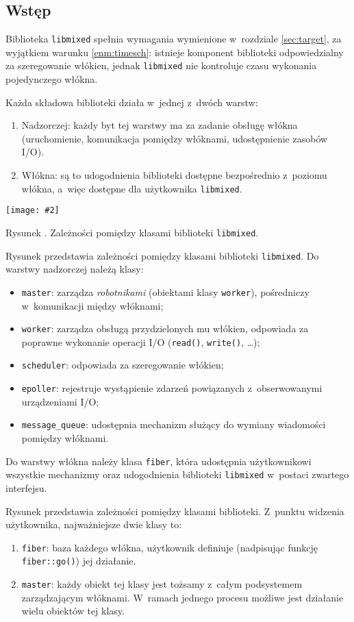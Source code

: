 \documentclass[12pt]{mwart}
\newcommand{\code}{\texttt}
\newcommand{\dcolon}{::}
\newcommand{\procbr}{()}
\newcommand{\function}[1]{\code{#1\procbr}}
\newcounter{figmain}
\newcommand{\myownfigure}[4]{ \newcounter{#1} \setcounter{#1}{\value{figmain}} \addtocounter{figmain}{1} \begin{center} \label{fig:#1} \centering \texttt{[image: \#2]}\\ \nopagebreak[5] \parbox[t]{11.5cm}{Rysunek \arabic{#1}. #3.} \end{center}}
\begin{document}
\subsection{Wstęp}
\indent 
  Biblioteka \code{libmixed} spełnia wymagania wymienione w~rozdziale \ref{sec:target}, za wyjątkiem warunku \ref{enm:timesch}:
  istnieje komponent biblioteki odpowiedzialny za szeregowanie włókien, jednak \code{libmixed} nie kontroluje czasu wykonania pojedynczego włókna.
\par
\indent
  Każda składowa biblioteki działa w~jednej z~dwóch warstw:
  \begin{enumerate}
    \item Nadzorczej: każdy byt tej warstwy ma za zadanie obsługę włókna (uruchomienie, komunikacja pomiędzy włóknami, udostępnienie
      zasobów I/O).
    \item Włókna: są to udogodnienia biblioteki dostępne bezpośrednio z~poziomu włókna, a~więc dostępne dla użytkownika \code{libmixed}.
  \end{enumerate}
\par
\begin{center}
  \myownfigure{libmixedoverview}{libmixedOverview.png}{Zależności pomiędzy klasami biblioteki \code{libmixed}}{.7}
\end{center}
\indent
  Rysunek  przedstawia zależności pomiędzy klasami biblioteki \code{libmixed}.
  Do warstwy nadzorczej należą klasy:
  \begin{itemize}
    \item \code{master}: zarządza \emph{robotnikami} (obiektami klasy \code{worker}), pośredniczy w~komunikacji między włóknami;
    \item \code{worker}: zarządza obsługą przydzielonych mu włókien, odpowiada za poprawne wykonanie operacji I/O (\function{read}, \function{write}, \ldots);
    \item \code{scheduler}: odpowiada za szeregowanie włókien;
    \item \code{epoller}: rejestruje wystąpienie zdarzeń powiązanych z~obserwowanymi urządzeniami I/O;
    \item \code{message\_queue}: udostępnia mechanizm służący do wymiany wiadomości pomiędzy włóknami.
  \end{itemize}
  Do warstwy włókna należy klasa \code{fiber}, która udostępnia użytkownikowi wszystkie mechanizmy oraz udogodnienia biblioteki \code{libmixed} w~postaci
  zwartego interfejsu.
\par
\indent
  Rysunek przedstawia zależności pomiędzy klasami biblioteki. Z~punktu widzenia użytkownika, najważniejsze dwie klasy  to:
  \begin{enumerate}
    \item \code{fiber}: baza każdego włókna, użytkownik definiuje (nadpisując funkcję \function{fiber\dcolon go}) jej działanie.
    \item \code{master}: każdy obiekt tej klasy jest tożsamy z~całym podsystemem zarządzającym włóknami. W~ramach jednego procesu możliwe jest działanie wielu
      obiektów tej klasy.
  \end{enumerate}
\par
%
\newpage
\end{document}
